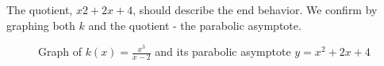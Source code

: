 The quotient, \( x2 + 2x + 4 \), should describe the end behavior. We confirm by graphing both \( k \) and the quotient - the parabolic asymptote.

\begin{figure}[htbp]
  \centering
  \caption{Graph of \( k(x) = \frac{x^3}{x - 2} \) and its parabolic asymptote \( y = x^2 + 2x + 4 \)}
\end{figure}